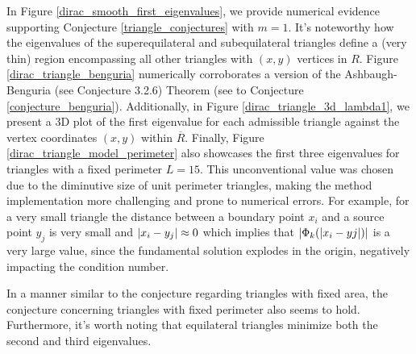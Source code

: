 In Figure \ref{dirac_smooth_first_eigenvalues}, we provide numerical evidence supporting Conjecture \ref{triangle_conjectures} with \(m=1\). It's noteworthy how the eigenvalues of the superequilateral and subequilateral triangles define a (very thin) region encompassing all other triangles with \((x, y)\) vertices in \(R\). Figure \ref{dirac_triangle_benguria} numerically corroborates a version of the Ashbaugh-Benguria (see Conjecture 3.2.6) Theorem
(see to Conjecture \ref{conjecture_benguria}). Additionally, in Figure \ref{dirac_triangle_3d_lambda1}, we present a 3D plot of the first eigenvalue for each admissible triangle against the vertex coordinates \((x,y)\) within \(\overline{R}\). Finally, Figure \ref{dirac_triangle_model_perimeter} also showcases the first three eigenvalues for triangles with a fixed perimeter \(L = 15\). This unconventional value was chosen due to the diminutive size of unit perimeter triangles, making the method implementation more challenging and prone to numerical errors. For example, for a very small triangle the distance between a boundary point \(x_i\) and a source point \(y_j\) is very small and \(\abs{x_i-y_j} \approx 0\) which implies that \(\abs{\Phi_k(\abs{x_i-yj})}\) is a very large value, since the fundamental solution explodes in the origin, negatively impacting the condition number.

In a manner similar to the conjecture regarding triangles with fixed area, the conjecture concerning triangles with fixed perimeter also seems to hold. Furthermore, it's worth noting that equilateral triangles minimize both the second and third eigenvalues.

